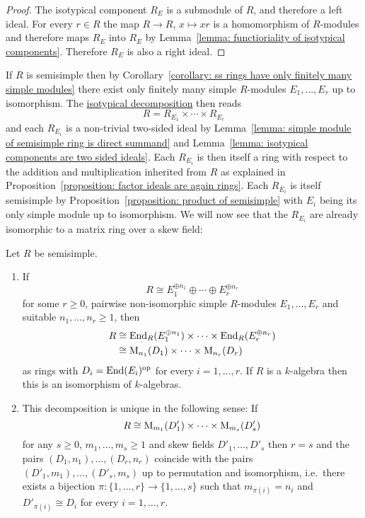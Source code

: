 \begin{proof}
  The isotypical component $R_E$ is a submodule of $R$, and therefore a left ideal.
  For every $r \in R$ the map $R \to R$, $x \mapsto xr$ is a homomorphism of $R$-modules and therefore maps $R_E$ into $R_E$ by Lemma~\ref{lemma: functioriality of isotypical components}.
  Therefore $R_E$ is also a right ideal.
\end{proof}


\begin{fluff}
  \label{fluff: intro to artin wedderburn}
  If $R$ is semisimple then by Corollary~\ref{corollary: ss rings have only finitely many simple modules} there exist only finitely many simple $R$-modules $E_1, \dotsc, E_r$ up to isomorphism.
  The \hyperref[theorem: isotypical decomposition]{isotypical decomposition} then reads
  \[
      R
    = R_{E_1} \times \dotsb \times R_{E_r}
  \]
  and each $R_{E_i}$ is a non-trivial two-sided ideal by Lemma~\ref{lemma: simple module of semisimple ring is direct summand} and Lemma~\ref{lemma: isotypical components are two sided ideals}.
  Each $R_{E_i}$ is then itself a ring with respect to the addition and multiplication inherited from $R$ as explained in Proposition~\ref{proposition: factor ideals are again rings}.
  Each $R_{E_i}$ is itself semisimple by Proposition~\ref{proposition: product of semisimple} with $E_i$ being its only simple module up to isomorphism.
  We will now see that the $R_{E_i}$ are already isomorphic to a matrix ring over a skew field:
\end{fluff}


\begin{theorem}
  \label{theorem: artin wedderburn theorem}
  Let $R$ be semisimple.
  \begin{enumerate}
    \item
      If
      \[
              R
        \cong E_1^{\oplus n_1} \oplus \dotsb \oplus E_r^{\oplus n_r}
      \]
      for some $r \geq 0$, pairwise non-isomorphic simple $R$-modules $E_1, \dotsc, E_r$ and suitable $n_1, \dotsc, n_r \geq 1$, then
      \begin{align*}
                R
        &\cong  \operatorname{End}_R(E_1^{\oplus n_1}) \times \dotsb \times \operatorname{End}_R(E_r^{\oplus n_r})  \\
        &\cong  \operatorname{M}_{n_1}(D_1) \times \dotsb \times  \operatorname{M}_{n_r}(D_r)
      \end{align*}
      as rings with $D_i = \operatorname{End}(E_i)^{\mathrm{op}}$ for every $i = 1, \dotsc, r$.
      If $R$ is a $k$-algebra then this is an isomorphism of $k$-algebras.
    \item
      This decomposition is unique in the following sense:
      If
      \[
              R
        \cong \operatorname{M}_{m_1}(D'_1) \times \dotsb \times \operatorname{M}_{m_s}(D'_s)
      \]
      for any $s \geq 0$, $m_1, \dotsc, m_s \geq 1$ and skew fields $D'_1, \dotsc, D'_s$ then $r = s$ and the pairs $(D_1, n_1), \dotsc, (D_r, n_r)$ coincide with the pairs $(D'_1, m_1), \dotsc, (D'_s, m_s)$ up to permutation and isomorphism, i.e.\ there exists a bijection $\pi \colon \{1, \dotsc, r\} \to \{1, \dotsc, s\}$ such that $m_{\pi(i)} = n_i$ and $D'_{\pi(i)} \cong D_i$ for every $i = 1, \dotsc, r$.
  \end{enumerate}
\end{theorem}


